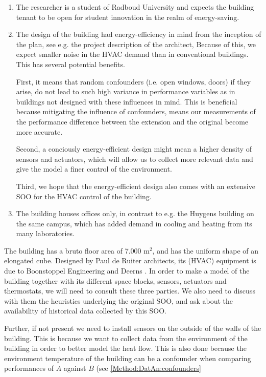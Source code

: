 \documentclass{article}
\theoremstyle{definition}
\theoremstyle{remark}
\begin{document}
\begin{enumerate}
    \item The researcher is a student of Radboud University and expects the building tenant to be open for student innovation in the realm of energy-saving. 
    \item The design of the building had energy-efficiency in mind from the inception of the plan, see e.g. the project description of the architect, \cite{PauldeRuiter_2023} Because of this, we expect smaller noise in the HVAC demand than in conventional buildings. This has several potential benefits.
    
    First, it means that random confounders (i.e. open windows, doors) if they arise, do not lead to such high variance in performance variables as in buildings not designed with these influences in mind. 
    This is beneficial because mitigating the influence of confounders, means our measurements of the performance difference between the extension and the original become more accurate. 
    
    Second, a conciously energy-efficient design might mean a higher density of sensors and actuators, which will allow us to collect more relevant data and give the model a finer control of the environment.

    Third, we hope that the energy-efficient design also comes with an extensive SOO for the HVAC control of the building.
    
    \item The building houses offices only, in contrast to e.g. the Huygens building on the same campus, which has added demand in cooling and heating from its many laboratories.
\end{enumerate}

The building has a bruto floor area of 7.000 m$^2$, and has the uniform shape of an elongated cube. Designed by Paul de Ruiter architects, its (HVAC) equipment is due to Boonstoppel Engineering and Deerns \cite{PauldeRuiter_2023}. In order to make a model of the building together with its different space blocks, sensors, actuators and thermostats, we will need to consult these three parties. We also need to discuss with them the heuristics underlying the original SOO, and ask about the availability of historical data collected by this SOO.

Further, if not present we need to install sensors on the outside of the walls of the building. This is because we want to collect data from the environment of the building in order to better model the heat flow. This is also done because the environment temperature of the building can be a confounder when comparing performances of $A$ against $B$ (see \ref{Method:DatAn:confounders}
\end{document}
